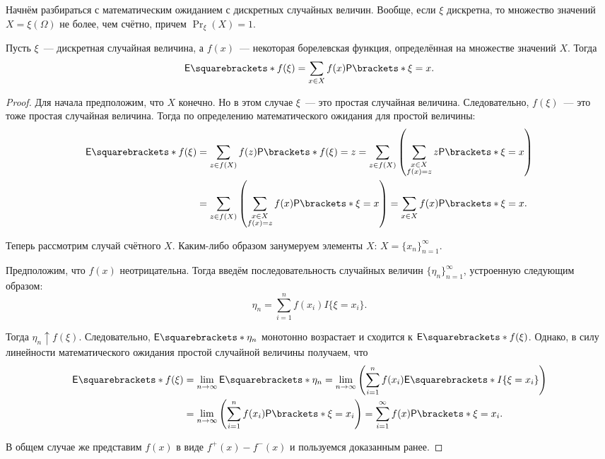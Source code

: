 Начнём разбираться с математическим ожиданием с дискретных случайных величин. Вообще, если \(\xi\) дискретна, то множество значений \(X = \xi(\Omega)\) не более, чем счётно, причем \(\Pr_{\xi}(X) = 1\).
\begin{theorem}
	Пусть \(\xi\)~--- дискретная случайная величина, а \(f(x)\)~--- некоторая борелевская функция, определённая на множестве значений \(X\). Тогда
	\[
	\E{f(\xi)} = \sum\limits_{x \in X} f(x)\Pr{\xi = x}.
	\]
\end{theorem}
\begin{proof}
	Для начала предположим, что \(X\) конечно. Но в этом случае \(\xi\)~--- это простая случайная величина. Следовательно, \(f(\xi)\)~--- это тоже простая случайная величина. Тогда по определению математического ожидания для простой величины:
	\begin{align}
		\E{f(\xi)} &= \sum\limits_{z \in f(X)} f(z)\Pr{f(\xi) = z} = \sum\limits_{z \in f(X)}\left(\sum\limits_{\substack{x \in X \\ f(x) = z}} z\Pr{\xi = x}\right) \\
		&= \sum\limits_{z \in f(X)}\left(\sum\limits_{\substack{x \in X \\ f(x) = z}} f(x)\Pr{\xi = x}\right) = \sum\limits_{x \in X} f(x)\Pr{\xi = x}.
	\end{align}
	
	Теперь рассмотрим случай счётного \(X\). Каким-либо образом занумеруем элементы \(X\): \(X = \{x_n\}_{n = 1}^{\infty}\).
	
	Предположим, что \(f(x)\) неотрицательна. Тогда введём последовательность случайных величин \(\{\eta_n\}_{n = 1}^{\infty}\), устроенную следующим образом:
	\[
	\eta_n = \sum_{i = 1}^{n} f(x_i)I\{\xi = x_i\}.
	\]
	
	Тогда \(\eta_n \uparrow f(\xi)\). Следовательно, \(\E{\eta_n}\) монотонно возрастает и сходится к \(\E{f(\xi)}\). Однако, в силу линейности математического ожидания простой случайной величины получаем, что
	\begin{align}
		\E{f(\xi)} &= \lim\limits_{n \to \infty} \E{\eta_n} = \lim\limits_{n \to \infty} \left(\sum_{i = 1}^{n} f(x_i)\E{I\{\xi = x_i\}}\right) \\
		&= \lim\limits_{n \to \infty} \left(\sum_{i = 1}^{n} f(x_i)\Pr{\xi = x_i}\right) = \sum_{i = 1}^{\infty} f(x)\Pr{\xi = x_i}.
	\end{align}
	
	В общем случае же представим \(f(x)\) в виде \(f^{+}(x) - f^{-}(x)\) и пользуемся доказанным ранее.
\end{proof}

